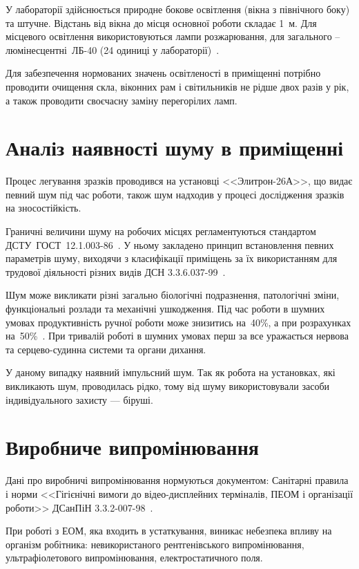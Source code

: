 \documentclass[a4paper,fontsize=14bp,ukrainian]{extreport}
\begin{document}
У лабораторії здійснюється природне бокове освітлення (вікна з північного боку) та штучне. Відстань від вікна до місця основної роботи складає 1~м. Для місцевого освітлення використовуються лампи розжарювання, для загального – люмінесцентні~ЛБ-40 (24 одиниці у лабораторії)~\cite{snip}.

Для забезпечення нормованих значень освітленості в приміщенні потрібно проводити очищення скла, віконних рам і світильників не рідше двох разів у рік, а також проводити своєчасну заміну перегорілих ламп.

\section{Аналіз наявності шуму в приміщенні}

Процес легування зразків проводився на установці <<Элитрон-26А>>, що видає певний шум під час роботи, також шум надходив у процесі дослідження зразків на зносостійкість.

Граничні величини шуму на робочих місцях регламентуються стандартом ДСТУ~ГОСТ~12.1.003-86~\cite{gost:org_work_room}. У ньому закладено принцип встановлення певних параметрів шуму, виходячи з класифікації приміщень за їх використанням для трудової діяльності різних видів ДСН 3.3.6.037-99~\cite{dns_noise}.

Шум може викликати різні загально біологічні подразнення, патологічні зміни, функціональні розлади та механічні ушкодження. Під час роботи в шумних умовах продуктивність ручної роботи може знизитись на~40\%, а при розрахунках на~50\%~\cite{dns_noise}. При тривалій роботі в шумних умовах перш за все уражається нервова та серцево-судинна системи та органи дихання.

У даному випадку наявний імпульсний шум. Так як робота на установках, які викликають шум, проводилась рідко, тому від шуму використовували засоби індивідуального захисту --- біруші.

\section{Виробниче випромінювання}

Дані про виробничі випромінювання нормуються документом: Санітарні правила і норми <<Гігієнічні вимоги до відео-дисплейних терміналів, ПЕОМ і організації роботи>> ДСанПіН 3.3.2-007-98~\cite{dsanpin98}.

При роботі з ЕОМ, яка входить в устаткування, виникає небезпека впливу на організм робітника: невикористаного рентгенівського випромінювання, ультрафіолетового випромінювання, електростатичного поля.
\end{document}
